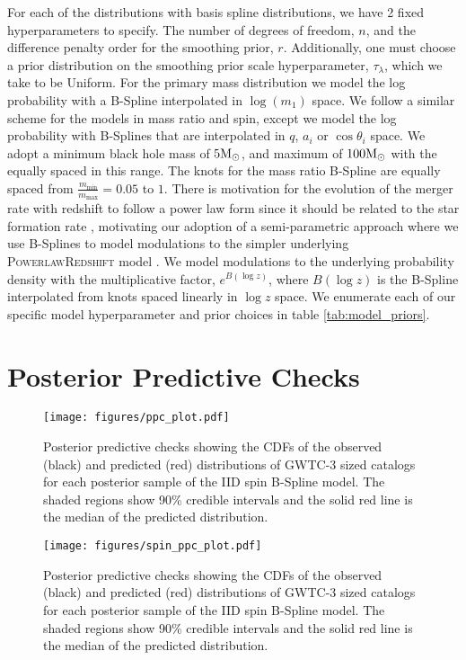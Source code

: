 For each of the distributions with basis spline distributions, we have 2 fixed hyperparameters to specify. 
The number of degrees of freedom, $n$, and the difference 
penalty order for the smoothing prior, $r$. Additionally, one must choose a prior distribution on the smoothing prior scale hyperparameter, 
$\tau_\lambda$, which we take to be Uniform. For the primary mass distribution we model the log probability with a B-Spline interpolated 
in $\log(m_1)$ space. We follow a similar scheme for the models in mass ratio and spin, except we model the log probability with 
B-Splines that are interpolated in $q$, $a_i$ or $\cos{\theta_i}$ space. We adopt a minimum black hole mass of $5{\rm M}_\odot$, 
and maximum of $100{\rm M}_\odot$ with the equally spaced in this range. The knots for the mass ratio B-Spline are equally spaced 
from $\frac{m_\mathrm{min}}{m_\mathrm{max}}=0.05$ to $1$. There is motivation for the evolution of the merger rate with redshift 
to follow a power law form since it should be related to the star formation rate \citep{Madau_2014}, 
motivating our adoption of a semi-parametric approach where we use B-Splines to model modulations to the 
simpler underlying \textsc{PowerlawRedshift} model \citep{Fishbach_2018redshift,Edelman_2022ApJ}. 
We model modulations to the underlying probability density with the multiplicative factor, $e^{B(\log z)}$, 
where $B(\log z)$ is the B-Spline interpolated from knots spaced linearly in $\log z$ space. 
We enumerate each of our specific model hyperparameter 
and prior choices in table \ref{tab:model_priors}.


\section{Posterior Predictive Checks} \label{sec:ppcs}

\begin{figure}
    \texttt{[image: figures/ppc\_plot.pdf]}
    \caption{Posterior predictive checks showing the CDFs of the observed (black) and predicted (red) distributions of GWTC-3 sized catalogs for each posterior sample of the IID spin B-Spline model. The shaded regions show 90\% credible intervals and the solid red line is the median of the predicted distribution. \LinkExplainer}
    \label{fig:ppc}
\end{figure}

\begin{figure}
    \texttt{[image: figures/spin\_ppc\_plot.pdf]}
    \caption{Posterior predictive checks showing the CDFs of the observed (black) and predicted (red) distributions of GWTC-3 sized catalogs for each posterior sample of the IID spin B-Spline model. The shaded regions show 90\% credible intervals and the solid red line is the median of the predicted distribution. \LinkExplainer}
    \label{fig:spin_ppc}
\end{figure}

